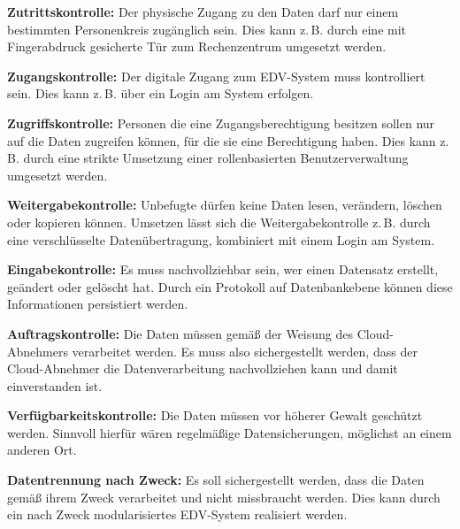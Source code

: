  \begin{seList}                            

\item \textbf{Zutrittskontrolle:}\newline
Der physische Zugang zu den Daten darf nur einem bestimmten Personenkreis zug\"anglich sein. Dies kann z.\,B. durch eine mit Fingerabdruck gesicherte T\"ur zum Rechenzentrum umgesetzt werden.
\item \textbf{Zugangskontrolle:}\newline
Der digitale Zugang zum EDV-System muss kontrolliert sein. Dies kann z.\,B. \"uber ein Login am System erfolgen.
\item \textbf{Zugriffskontrolle:}\newline
Personen die eine Zugangsberechtigung besitzen sollen nur auf die Daten zugreifen k\"onnen, f\"ur die sie eine Berechtigung haben. Dies kann z.\,B. durch eine strikte Umsetzung einer rollenbasierten Benutzerverwaltung umgesetzt werden.  
\item \textbf{Weitergabekontrolle:}\newline
Unbefugte d\"urfen keine Daten lesen, ver\"andern, l\"oschen oder kopieren k\"onnen. Umsetzen l\"asst sich die Weitergabekontrolle z.\,B. durch eine verschl\"usselte Daten\"ubertragung, kombiniert mit einem Login am System.
\item \textbf{Eingabekontrolle:}\newline
Es muss nachvollziehbar sein, wer einen Datensatz erstellt, ge\"andert oder gel\"oscht hat. Durch ein Protokoll auf Datenbankebene k\"onnen diese Informationen persistiert werden. 
\item \textbf{Auftragskontrolle:}\newline
Die Daten m\"ussen gem\"a{\ss} der Weisung des Cloud-Abnehmers verarbeitet werden. Es muss also sichergestellt werden, dass der Cloud-Abnehmer die Datenverarbeitung nachvollziehen kann und damit einverstanden ist.
\item \textbf{Verf\"ugbarkeitskontrolle:}\newline
Die Daten m\"ussen vor h\"oherer Gewalt gesch\"utzt werden. Sinnvoll hierf\"ur w\"aren regelm\"a{\ss}ige Datensicherungen, m\"oglichst an einem anderen Ort.
\item \textbf{Datentrennung nach Zweck:}\newline
Es soll sichergestellt werden, dass die Daten gem\"a{\ss} ihrem Zweck verarbeitet und nicht missbraucht werden. Dies kann durch ein nach Zweck modularisiertes  EDV-System realisiert werden.
\end{seList}

